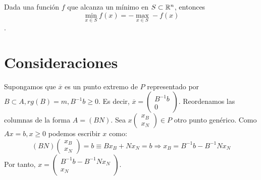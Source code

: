 \documentclass[PM.tex]{subfiles}
\begin{document}
\begin{nota}
Dada una función $f$ que alcanza un mínimo en $S\subset\mathbb{R}^n$, entonces \[\min_{x\in S} f(x)= -\max_{x\in S}-f(x)\].
\end{nota}

\section{Consideraciones}
Supongamos que $\overline{x}$ es un punto extremo de $P$ representado por $B\subset A, rg(B)=m, B^{-1}b\geq 0$. Es decir, $\overline{x}=\begin{pmatrix}
B^{-1}b\\
0
\end{pmatrix}$. Reordenamos las columnas de la forma $A=(B N)$. Sea $x \begin{pmatrix}
x_B\\
x_N
\end{pmatrix} \in P$ otro punto genérico. Como $Ax=b, x\geq 0$ podemos escribir $x$ como:
\[ (B N) \begin{pmatrix}
x_B\\
x_N
\end{pmatrix}= b\equiv Bx_B + Nx_N=b \Rightarrow x_B = B^{-1}b-B^{-1}Nx_N \]
Por tanto, $x=\begin{pmatrix}
B^{-1}b-B^{-1}Nx_N\\
x_N
\end{pmatrix}$. 
\end{document}
